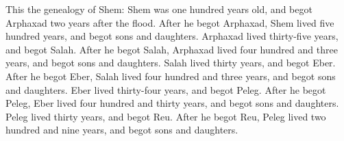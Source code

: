 
\bverse This \is the genealogy of Shem: Shem was one hundred years old, and begot Arphaxad two years after the flood.
\bverse After he begot Arphaxad, Shem lived five hundred years, and begot sons and daughters.
\bverse Arphaxad lived thirty-five years, and begot Salah.
\bverse After he begot Salah, Arphaxad lived four hundred and three years, and begot sons and daughters.
\bverse Salah lived thirty years, and begot Eber.
\bverse After he begot Eber, Salah lived four hundred and three years, and begot sons and daughters.
\bverse Eber lived thirty-four years, and begot Peleg.
\bverse After he begot Peleg, Eber lived four hundred and thirty years, and begot sons and daughters.
\bverse Peleg lived thirty years, and begot Reu. After he begot Reu, Peleg lived two hundred and nine years, and begot sons and daughters.
\bverse 
\bverse 
\bverse 
\bverse 
\bverse 
\bverse 
\bverse 
\bverse 
\bverse 
\bverse 
\bverse 
\bverse 
\bverse 
\bverse 
